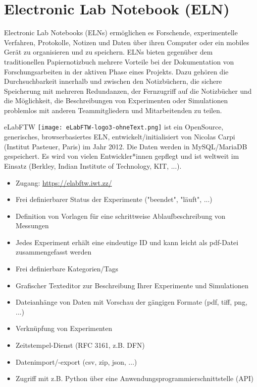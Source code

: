 \section[Electronic Lab Notebook]{Electronic Lab Notebook (ELN)}\label{ssc:ELN}

Electronic Lab Notebooks (ELNs) ermöglichen es Forschende, experimentelle
Verfahren, Protokolle, Notizen und Daten über ihren Computer oder ein mobiles
Gerät zu organisieren und zu speichern. ELNs bieten gegenüber dem traditionellen
Papiernotizbuch mehrere Vorteile bei der Dokumentation von Forschungsarbeiten in
der aktiven Phase eines Projekts. Dazu gehören die Durchsuchbarkeit innerhalb
und zwischen den Notizbüchern, die sichere Speicherung mit mehreren Redundanzen,
der Fernzugriff auf die Notizbücher und die Möglichkeit, die Beschreibungen von
Experimenten oder Simulationen problemlos mit anderen Teammitgliedern und
Mitarbeitenden zu teilen.

eLabFTW \texttt{[image: eLabFTW-logo3-ohneText.png]} ist ein OpenSource, generisches, browserbasiertes ELN, entwickelt/initialisiert von Nicolas Carpi (Institut Pasteuer, Paris) im Jahr 2012. Die Daten werden in MySQL/MariaDB gespeichert. Es wird von vielen Entwickler*innen gepflegt und ist weltweit im Einsatz (Berkley, Indian Institute of Technology, KIT, ...).
\begin{itemize}
  \item Zugang: \url{https://elabftw.iwt.zz/}
  \item Frei definierbarer Status der Experimente ("beendet", "läuft", ...)
  \item Definition von Vorlagen für eine schrittweise Ablaufbeschreibung von
        Messungen
  \item Jedes Experiment erhält eine eindeutige ID und kann leicht als pdf-Datei
        zusammengefasst werden
  \item Frei definierbare Kategorien/Tags
  \item Grafischer Texteditor zur Beschreibung Ihrer Experimente und Simulationen
  \item Dateianhänge von Daten mit Vorschau der gängigen Formate (pdf, tiff,
        png, ...)
  \item Verknüpfung von Experimenten
  \item Zeitstempel-Dienst (RFC 3161, z.B. DFN)
  \item Datenimport/-export (csv, zip, json, ...)
  \item Zugriff mit z.B. Python über eine Anwendungsprogrammierschnittstelle (API)
\end{itemize}

